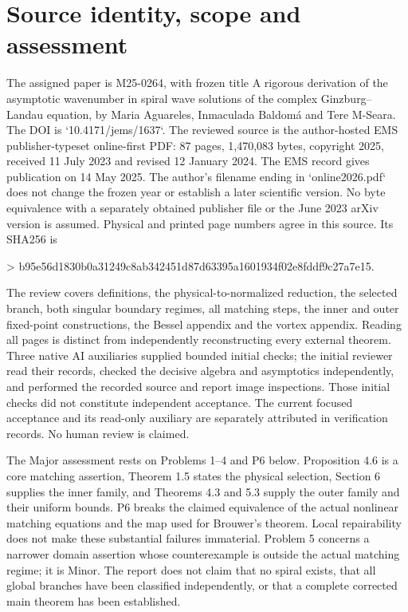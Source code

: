 \documentclass[10pt]{article}
\begin{document}
\section*{Source identity, scope and assessment}
The assigned paper is M25-0264, with frozen title A rigorous derivation of the asymptotic wavenumber in spiral wave solutions of the complex Ginzburg–Landau equation, by Maria Aguareles, Inmaculada Baldomá and Tere M-Seara. The DOI is `10.4171/jems/1637`. The reviewed source is the author-hosted EMS publisher-typeset online-first PDF: 87 pages, 1,470,083 bytes, copyright 2025, received 11 July 2023 and revised 12 January 2024. The EMS record gives publication on 14 May 2025. The author’s filename ending in `online2026.pdf` does not change the frozen year or establish a later scientific version. No byte equivalence with a separately obtained publisher file or the June 2023 arXiv version is assumed. Physical and printed page numbers agree in this source. Its SHA256 is\par
> b95e56d1830b0a31249c8ab342451d87d63395a1601934f02e8fddf9c27a7e15.\par
The review covers definitions, the physical-to-normalized reduction, the selected branch, both singular boundary regimes, all matching steps, the inner and outer fixed-point constructions, the Bessel appendix and the vortex appendix. Reading all pages is distinct from independently reconstructing every external theorem. Three native AI auxiliaries supplied bounded initial checks; the initial reviewer read their records, checked the decisive algebra and asymptotics independently, and performed the recorded source and report image inspections. Those initial checks did not constitute independent acceptance. The current focused acceptance and its read-only auxiliary are separately attributed in verification records. No human review is claimed.\par
The Major assessment rests on Problems 1–4 and P6 below. Proposition 4.6 is a core matching assertion, Theorem 1.5 states the physical selection, Section 6 supplies the inner family, and Theorems 4.3 and 5.3 supply the outer family and their uniform bounds. P6 breaks the claimed equivalence of the actual nonlinear matching equations and the map used for Brouwer’s theorem. Local repairability does not make these substantial failures immaterial. Problem 5 concerns a narrower domain assertion whose counterexample is outside the actual matching regime; it is Minor. The report does not claim that no spiral exists, that all global branches have been classified independently, or that a complete corrected main theorem has been established.\par
\end{document}
